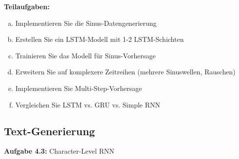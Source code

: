 \documentclass[12pt,a4paper]{article}
\begin{document}
\textbf{Teilaufgaben:}
\begin{enumerate}[(a)]
    \item Implementieren Sie die Sinus-Datengenerierung
    \item Erstellen Sie ein LSTM-Modell mit 1-2 LSTM-Schichten
    \item Trainieren Sie das Modell für Sinus-Vorhersage
    \item Erweitern Sie auf komplexere Zeitreihen (mehrere Sinuswellen, Rauschen)
    \item Implementieren Sie Multi-Step-Vorhersage
    \item Vergleichen Sie LSTM vs. GRU vs. Simple RNN
\end{enumerate}

\subsection{Text-Generierung}

\textbf{Aufgabe 4.3:} Character-Level RNN
\end{document}
